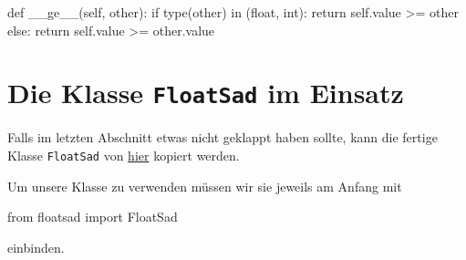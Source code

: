 \documentclass[
  letterpaper,
  DIV=11,
  oneside]{scrreprt}
\newenvironment{Shaded}{\begin{snugshade}}{\end{snugshade}}
\newcommand{\BuiltInTok}[1]{\textcolor[rgb]{0.00,0.23,0.31}{#1}}
\newcommand{\ControlFlowTok}[1]{\textcolor[rgb]{0.00,0.23,0.31}{#1}}
\newcommand{\FunctionTok}[1]{\textcolor[rgb]{0.28,0.35,0.67}{#1}}
\newcommand{\ImportTok}[1]{\textcolor[rgb]{0.00,0.46,0.62}{#1}}
\newcommand{\KeywordTok}[1]{\textcolor[rgb]{0.00,0.23,0.31}{#1}}
\newcommand{\NormalTok}[1]{\textcolor[rgb]{0.00,0.23,0.31}{#1}}
\newcommand{\OperatorTok}[1]{\textcolor[rgb]{0.37,0.37,0.37}{#1}}
\newcommand{\VariableTok}[1]{\textcolor[rgb]{0.07,0.07,0.07}{#1}}
\theoremstyle{definition}
\theoremstyle{definition}
\theoremstyle{remark}
\begin{document}
\begin{Shaded}
\begin{Highlighting}[]
\KeywordTok{def} \FunctionTok{\_\_ge\_\_}\NormalTok{(}\VariableTok{self}\NormalTok{, other):}
    \ControlFlowTok{if} \BuiltInTok{type}\NormalTok{(other) }\KeywordTok{in}\NormalTok{ (}\BuiltInTok{float}\NormalTok{, }\BuiltInTok{int}\NormalTok{):}
        \ControlFlowTok{return} \VariableTok{self}\NormalTok{.value }\OperatorTok{\textgreater{}=}\NormalTok{ other}
    \ControlFlowTok{else}\NormalTok{:}
        \ControlFlowTok{return} \VariableTok{self}\NormalTok{.value }\OperatorTok{\textgreater{}=}\NormalTok{ other.value}
\end{Highlighting}
\end{Shaded}

\hypertarget{die-klasse-floatsad-im-einsatz}{%
\section{\texorpdfstring{Die Klasse \texttt{FloatSad} im
Einsatz}{Die Klasse FloatSad im Einsatz}}\label{die-klasse-floatsad-im-einsatz}}

Falls im letzten Abschnitt etwas nicht geklappt haben sollte, kann die
fertige Klasse \texttt{FloatSad} von \href{floatsad.py}{hier} kopiert
werden.

Um unsere Klasse zu verwenden müssen wir sie jeweils am Anfang mit

\begin{Shaded}
\begin{Highlighting}[]
\ImportTok{from}\NormalTok{ floatsad }\ImportTok{import}\NormalTok{ FloatSad}
\end{Highlighting}
\end{Shaded}

einbinden.
\end{document}
